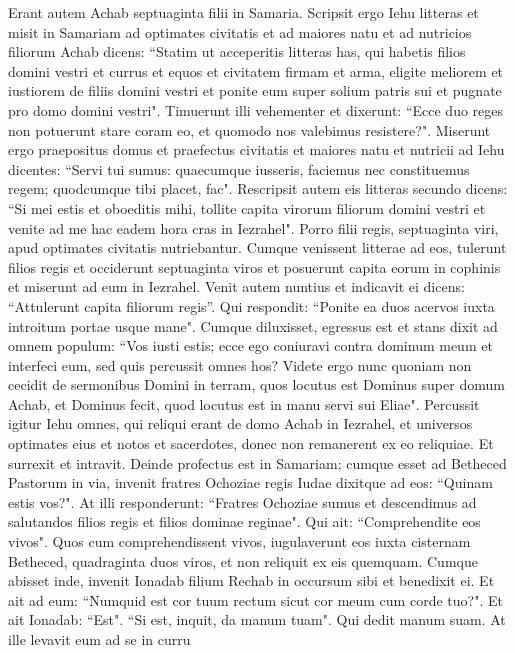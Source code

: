 \begin{biblechapter}  
\verse Erant autem Achab septuaginta filii in Samaria. Scripsit ergo Iehu litteras et misit in Samariam ad optimates civitatis et ad maiores natu et ad nutricios filiorum Achab dicens: 
\verse “Statim ut acceperitis litteras has, qui habetis filios domini vestri et currus et equos et civitatem firmam et arma, 
\verse eligite meliorem et iustiorem de filiis domini vestri et ponite eum super solium patris sui et pugnate pro domo domini vestri". 
\verse Timuerunt illi vehementer et dixerunt: “Ecce duo reges non potuerunt stare coram eo, et quomodo nos valebimus resistere?". 
\verse Miserunt ergo praepositus domus et praefectus civitatis et maiores natu et nutricii ad Iehu dicentes: “Servi tui sumus: quaecumque iusseris, faciemus nec constituemus regem; quodcumque tibi placet, fac". 
\verse Rescripsit autem eis litteras secundo dicens: “Si mei estis et oboeditis mihi, tollite capita virorum filiorum domini vestri et venite ad me hac eadem hora cras in Iezrahel". Porro filii regis, septuaginta viri, apud optimates civitatis nutriebantur. 
\verse Cumque venissent litterae ad eos, tulerunt filios regis et occiderunt septuaginta viros et posuerunt capita eorum in cophinis et miserunt ad eum in Iezrahel. 
\verse Venit autem nuntius et indicavit ei dicens: “Attulerunt capita filiorum regis”. Qui respondit: “Ponite ea duos acervos iuxta introitum portae usque mane". 
\verse Cumque diluxisset, egressus est et stans dixit ad omnem populum: “Vos iusti estis; ecce ego coniuravi contra dominum meum et interfeci eum, sed quis percussit omnes hos? 
\verse Videte ergo nunc quoniam non cecidit de sermonibus Domini in terram, quos locutus est Dominus super domum Achab, et Dominus fecit, quod locutus est in manu servi sui Eliae". 
\verse Percussit igitur Iehu omnes, qui reliqui erant de domo Achab in Iezrahel, et universos optimates eius et notos et sacerdotes, donec non remanerent ex eo reliquiae. 
\verse Et surrexit et intravit. Deinde profectus est in Samariam; cumque esset ad Betheced Pastorum in via, 
\verse invenit fratres Ochoziae regis Iudae dixitque ad eos: “Quinam estis vos?". At illi responderunt: “Fratres Ochoziae sumus et descendimus ad salutandos filios regis et filios dominae reginae". 
\verse Qui ait: “Comprehendite eos vivos". Quos cum comprehendissent vivos, iugulaverunt eos iuxta cisternam Betheced, quadraginta duos viros, et non reliquit ex eis quemquam. 
\verse Cumque abisset inde, invenit Ionadab filium Rechab in occursum sibi et benedixit ei. Et ait ad eum: “Numquid est cor tuum rectum sicut cor meum cum corde tuo?". Et ait Ionadab: “Est". “Si est, inquit, da manum tuam". Qui dedit manum suam. At ille levavit eum ad se in curru 

\end{biblechapter}
